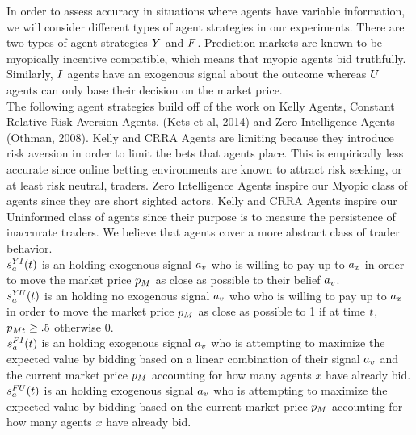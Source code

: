In order to assess accuracy in situations where agents have variable information, we will consider different types of agent strategies in our experiments. There are two types of agent strategies  $Y$ and  $F$. Prediction markets are known to be myopically incentive compatible, which means that myopic agents bid truthfully. Similarly,  $I$ agents have an exogenous signal about the outcome whereas  $U$ agents can only base their decision on the market price. \\

The following agent strategies build off of the work on Kelly Agents, Constant Relative Risk Aversion Agents, (Kets et al, 2014) and Zero Intelligence Agents (Othman, 2008). Kelly and CRRA Agents are limiting because they introduce risk aversion in order to limit the bets that agents place. This is empirically less accurate since online betting environments are known to attract risk seeking, or at least risk neutral, traders. Zero Intelligence Agents inspire our Myopic class of agents since they are short sighted actors. Kelly and CRRA Agents inspire our Uninformed class of agents since their purpose is to measure the persistence of inaccurate traders. We believe that  agents cover a more abstract class of trader behavior.\\

$s^{YI}_a(t)$ is an  holding exogenous signal $a_v$ who is willing to pay up to $a_x$ in order to move the market price $p_M$ as close as possible to their belief $a_v$. \\

$s^{YU}_a(t)$ is an  holding no exogenous signal $a_v$ who who is willing to pay up to $a_x$ in order to move the market price $p_M$ as close as possible to 1 if at time $t$, $p_{Mt} \ge .5$ otherwise 0. \\

$s^{FI}_a(t)$ is an holding exogenous signal $a_v$ who is attempting to maximize the expected value by bidding based on a linear combination of their signal $a_v$ and the current market price $p_M$ accounting for how many agents $x$ have already bid. \\

$s^{FU}_a(t)$ is an  holding exogenous signal $a_v$ who is attempting to maximize the expected value by bidding based on the current market price $p_M$ accounting for how many agents $x$ have already bid. \\
